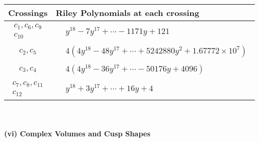 \documentclass[1p]{elsarticle_modified}
\theoremstyle{definition}
\begin{document}
\begin{tabular}{m{50pt}|m{274pt}}
Crossings & \hspace{64pt}Riley Polynomials at each crossing \\
\hline $$\begin{aligned}c_{1},c_{6},c_{9}\\c_{10}\end{aligned}$$&$\begin{aligned}
&y^{18}-7 y^{17}+\cdots-1171 y+121
\end{aligned}$\\
\hline $$\begin{aligned}c_{2},c_{5}\end{aligned}$$&$\begin{aligned}
&4(4 y^{18}-48 y^{17}+\cdots+5242880 y^{2}+1.67772\times10^{7})
\end{aligned}$\\
\hline $$\begin{aligned}c_{3},c_{4}\end{aligned}$$&$\begin{aligned}
&4(4 y^{18}-36 y^{17}+\cdots-50176 y+4096)
\end{aligned}$\\
\hline $$\begin{aligned}c_{7},c_{8},c_{11}\\c_{12}\end{aligned}$$&$\begin{aligned}
&y^{18}+3 y^{17}+\cdots+16 y+4
\end{aligned}$\\
\hline
\end{tabular}\\~\\
\newpage\flushleft \textbf{(vi) Complex Volumes and Cusp Shapes}
\end{document}
